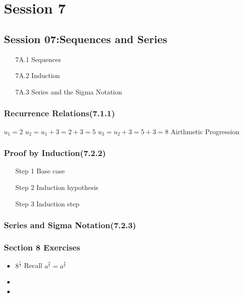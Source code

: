 

\chapter{Session 7}


\section*{Session 07:Sequences and Series}
\begin{itemize}
\item[7A.1] Sequences
\item[7A.2] Induction
\item[7A.3] Series and the Sigma Notation
\end{itemize}

\subsection*{Recurrence Relations(7.1.1)}



$u_1 = 2$
$u_2 = u_1 + 3 = 2 +3 = 5$
$u_3 = u_2 + 3 = 5+ 3 = 8$
Airthmetic Progression


\subsection*{Proof by Induction(7.2.2)}
\begin{itemize}
\item[Step 1] Base case
\item[Step 2] Induction hypothesis
\item[Step 3] Induction step
\end{itemize}



\subsection*{Series and Sigma Notation(7.2.3)}








\subsection*{Section 8 Exercises}
\begin{itemize}
\item $8^{\frac{1}{3}}$ Recall $a^{\frac{b}{c}} = a^{\frac{b}{c}}$
\item
\item
\end{itemize}




